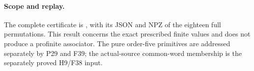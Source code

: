 \paragraph{Scope and replay.}
The complete certificate is
,
with its JSON and NPZ of the eighteen full permutations.
This result concerns the exact prescribed finite
values and does not produce a profinite associator.
The pure order-five primitives are addressed separately
by P29 and F39; the actual-source common-word membership
is the separately proved H9/F38 input.
